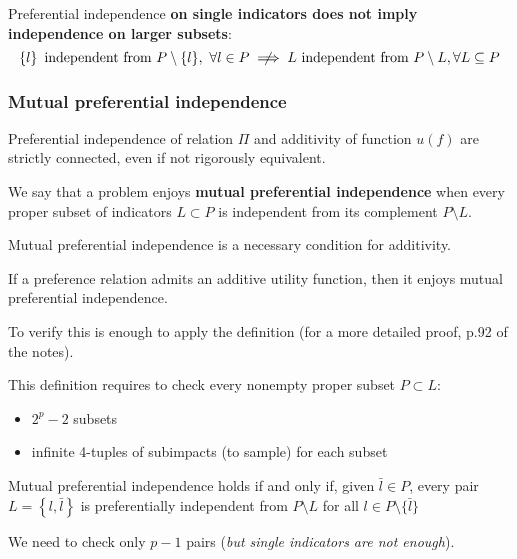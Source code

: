 Preferential independence \textbf{on single indicators does not imply independence on larger subsets}: 
$$ \left\{l\right\} \text{ independent from } P \setminus \{l\}, \ \forall l \in P \centernot \implies L \text{ independent from } P \setminus L, \forall L \subseteq P $$

\subsubsection{Mutual preferential independence}

Preferential independence of relation $\Pi$ and additivity of function $u(f)$ are strictly connected, even if not rigorously equivalent. \\

\begin{definition}
	We say that a problem enjoys \textbf{mutual preferential independence} when every proper subset of indicators $L \subset P$ is independent from its complement $P \setminus L$.
\end{definition}

Mutual preferential independence is a necessary condition for additivity. \\

\begin{theo}
	If a preference relation admits an additive utility function, then it enjoys mutual preferential independence.
\end{theo}
To verify this is enough to apply the definition (for a more detailed proof, p.92 of the notes).

This definition requires to check every nonempty proper subset $P \subset L$: 
\begin{itemize}
	\item $2^p - 2$ subsets
	
	\item infinite 4-tuples of subimpacts (to sample) for each subset \\
\end{itemize}

\begin{theo}
	Mutual preferential independence holds if and only if, given $\bar l \in P$, every pair $L = \left\{l, \bar l \right\}$ is preferentially independent from $P \setminus L$ for all $l \in P \setminus \{\bar l\}$
\end{theo}

We need to check only $p-1$ pairs (\textit{but single indicators are not enough}). \\

